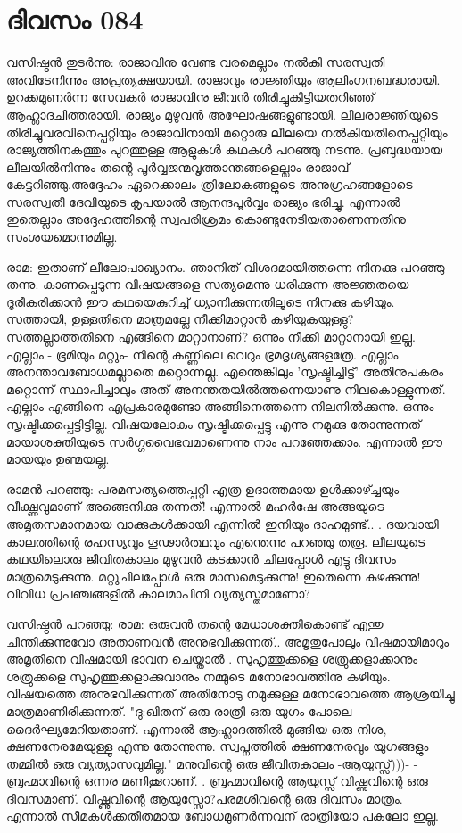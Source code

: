  
\section{ദിവസം 084}


വസിഷ്ഠന്‍ തുടര്‍ന്നു: രാജാവിനു വേണ്ട വരമെല്ലാം നല്‍കി സരസ്വതി അവിടേനിന്നും അപ്രത്യക്ഷയായി. രാജാവും രാജ്ഞിയും ആലിംഗനബദ്ധരായി. ഉറക്കമുണര്‍ന്ന സേവകര്‍ രാജാവിനു ജീവന്‍ തിരിച്ചുകിട്ടിയതറിഞ്ഞ്‌ ആഹ്ലാദചിത്തരായി. രാജ്യം മുഴുവന്‍ അഘോഷങ്ങളുണ്ടായി. ലീലരാജ്ഞിയുടെ തിരിച്ചുവരവിനെപ്പറ്റിയും രാജാവിനായി മറ്റൊരു ലീലയെ നല്‍കിയതിനെപ്പറ്റിയും രാജ്യത്തിനകത്തും പുറത്തുള്ള ആളുകള്‍ കഥകള്‍ പറഞ്ഞു നടന്നു. പ്രബുദ്ധയായ ലീലയില്‍നിന്നും തന്റെ പൂര്‍വ്വജന്മവൃത്താന്തങ്ങളെല്ലാം രാജാവ്‌ കേട്ടറിഞ്ഞു.അദ്ദേഹം ഏറെക്കാലം ത്രിലോകങ്ങളുടെ അനുഗ്രഹങ്ങളോടെ സരസ്വതീ ദേവിയുടെ കൃപയാല്‍ ആനന്ദപൂര്‍വ്വം രാജ്യം ഭരിച്ചു. എന്നാല്‍ ഇതെല്ലാം അദ്ദേഹത്തിന്റെ സ്വപരിശ്രമം കൊണ്ടുനേടിയതാണെന്നതിനു സംശയമൊന്നുമില്ല. 

രാമ: ഇതാണ്‌ ലീലോപാഖ്യാനം. ഞാനിത്‌ വിശദമായിത്തന്നെ നിനക്കു പറഞ്ഞു തന്നു. കാണപ്പെടുന്ന വിഷയങ്ങളെ സത്യമെന്നു ധരിക്കുന്ന അജ്ഞതയെ ദൂരീകരിക്കാന്‍ ഈ കഥയെകുറിച്ച്‌ ധ്യാനിക്കുന്നതിലൂടെ നിനക്കു കഴിയും. സത്തായി, ഉള്ളതിനെ മാത്രമല്ലേ നീക്കിമാറ്റാന്‍ കഴിയുകയുള്ളു? സത്തല്ലാത്തതിനെ എങ്ങിനെ മാറ്റാനാണ്‌? ഒന്നും നീക്കി മാറ്റാനായി ഇല്ല. എല്ലാം - ഭൂമിയും മറ്റും- നിന്റെ കണ്ണിലെ വെറും ഭ്രമദൃശ്യങ്ങളത്രേ. എല്ലാം അനന്താവബോധമല്ലാതെ മറ്റൊന്നല്ല. എന്തെങ്കിലും 'സൃഷ്ടിച്ചിട്ട്‌' അതിനുപകരം മറ്റൊന്ന് സ്ഥാപിച്ചാലും അത്‌ അനന്തതയില്‍ത്തന്നെയാണു നിലകൊള്ളുന്നത്‌. എല്ലാം എങ്ങിനെ എപ്രകാരമുണ്ടോ അങ്ങിനെത്തന്നെ നിലനില്‍ക്കുന്നു. ഒന്നും സൃഷ്ടിക്കപ്പെട്ടിട്ടില്ല. വിഷയലോകം സൃഷ്ടിക്കപ്പെട്ടു എന്നു നമുക്കു തോന്നുന്നത്‌ മായാശക്തിയുടെ സര്‍ഗ്ഗവൈഭവമാണെന്നു നാം പറഞ്ഞേക്കാം. എന്നാല്‍ ഈ മായയും ഉണ്മയല്ല.

രാമന്‍ പറഞ്ഞു: പരമസത്യത്തെപ്പറ്റി എത്ര ഉദാത്തമായ ഉള്‍ക്കാഴ്ച്ചയും വീക്ഷ്ണവുമാണ്‌ അങ്ങെനിക്കു തന്നത്‌! എന്നാല്‍ മഹര്‍ഷേ അങ്ങയുടെ അമൃതസമാനമായ വാക്കുകള്‍ക്കായി എന്നില്‍ ഇനിയും ദാഹമുണ്ട്‌.. . ദയവായി കാലത്തിന്റെ രഹസ്യവും ഗൂഢാര്‍ത്ഥവും എന്തെന്നു പറഞ്ഞു തരൂ. ലീലയുടെ കഥയിലൊരു ജീവിതകാലം മുഴുവന്‍ കടക്കാന്‍ ചിലപ്പോള്‍ എട്ടു ദിവസം മാത്രമെടുക്കുന്നു. മറ്റുചിലപ്പോള്‍ ഒരു മാസമെടുക്കുന്നു! ഇതെന്നെ കുഴക്കുന്നു! വിവിധ പ്രപഞ്ചങ്ങളില്‍ കാലമാപിനി വ്യത്യസ്തമാണോ? 

വസിഷ്ഠന്‍ പറഞ്ഞു: രാമ: ഒരുവന്‍ തന്റെ മേധാശക്തികൊണ്ട്‌ എന്തു ചിന്തിക്കുന്നുവോ അതാണവന്‍ അനുഭവിക്കുന്നത്‌.. അമൃതുപോലും വിഷമായിമാറും അമൃതിനെ വിഷമായി ഭാവന ചെയ്താല്‍ .   സുഹൃത്തുക്കളെ  ശത്രുക്കളാക്കാനും ശത്രുക്കളെ സുഹൃത്തുക്കളാക്കുവാനും നമ്മുടെ മനോഭാവത്തിനു കഴിയും. വിഷയത്തെ അനുഭവിക്കുന്നത്‌ അതിനോടു നമുക്കുള്ള മനോഭാവത്തെ ആശ്രയിച്ചു മാത്രമാണിരിക്കുന്നത്‌. "ദു:ഖിതന്‌ ഒരു രാത്രി ഒരു യുഗം പോലെ ദൈര്‍ഘ്യമേറിയതാണ്‌. എന്നാല്‍ ആഹ്ലാദത്തില്‍ മുങ്ങിയ ഒരു നിശ, ക്ഷണനേരമേയുള്ളൂ എന്നു തോന്നുന്നു. സ്വപ്നത്തില്‍ ക്ഷണനേരവും യുഗങ്ങളും തമ്മില്‍ ഒരു വ്യത്യാസവുമില്ല." മനുവിന്റെ ഒരു ജീവിതകാലം -ആയുസ്സ്‌)))- - ബ്രഹ്മാവിന്റെ ഒന്നര മണിക്കൂറാണ്‌. .  ബ്രഹ്മാവിന്റെ ആയുസ്സ്‌ വിഷ്ണുവിന്റെ ഒരു ദിവസമാണ്‌. വിഷ്ണുവിന്റെ ആയുസ്സോ?പരമശിവന്റെ ഒരു ദിവസം മാത്രം. എന്നാല്‍ സീമകള്‍ക്കതീതമായ ബോധമുണര്‍ന്നവന്‌ രാത്രിയോ പകലോ ഇല്ല.

